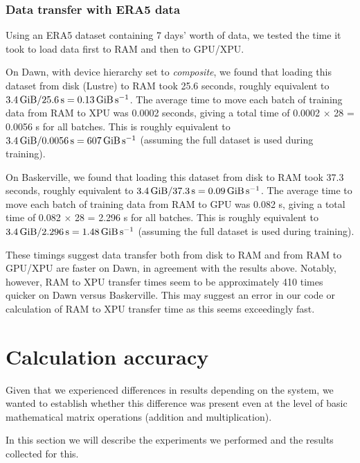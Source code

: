 \subsubsection{Data transfer with ERA5 data}

Using an ERA5 dataset containing 7 days' worth of data, we tested the time it took to load data first to RAM and then to GPU/XPU.

On Dawn, with device hierarchy set to \textit{composite}, we found that loading this dataset from disk (Lustre) to RAM took 25.6 seconds, roughly equivalent to $\qty{3.4}{\gibi\byte} / \qty{25.6}{\second} = \qty{0.13}{\gibi\byte\per\second}$. The average time to move each batch of training data from RAM to XPU was 0.0002 seconds, giving a total time of 0.0002 $\times$ 28 = 0.0056 s for all batches. This is roughly equivalent to $\qty{3.4}{\gibi\byte} / \qty{0.0056}{\second}
= \qty{607}{\gibi\byte\per\second}$ (assuming the full dataset is used during training).

On Baskerville, we found that loading this dataset from disk to RAM took 37.3 seconds, roughly equivalent to $\qty{3.4}{\gibi\byte} / \qty{37.3}{\second} = \qty{0.09}{\gibi\byte\per\second}$. The average time to move each batch of training data from RAM to GPU was 0.082 s, giving a total time of 0.082 $\times$ 28 = 2.296 s for all batches. This is roughly equivalent to $\qty{3.4}{\gibi\byte} / \qty{2.296}{\second} = \qty{1.48}{\gibi\byte\per\second}$ (assuming the full dataset is used during training).

These timings suggest data transfer both from disk to RAM and from RAM to GPU/XPU are faster on Dawn, in agreement with the results above. Notably, however, RAM to XPU transfer times seem to be approximately 410 times quicker on Dawn versus Baskerville. This may suggest an error in our code or calculation of RAM to XPU transfer time as this seems exceedingly fast.

\section{Calculation accuracy}
\label{section:errors}

Given that we experienced differences in results depending on the system, we wanted to establish whether this difference was present even at the level of basic mathematical matrix operations (addition and multiplication).

In this section we will describe the experiments we performed and the results collected for this.

